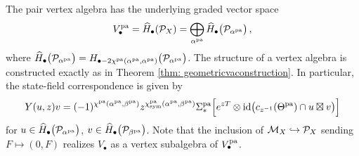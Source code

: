 \documentclass[a4paper, 12pt]{amsart}
\begin{document}
The pair vertex algebra has the underlying graded vector space 
$$
V^{\mathop{\rm pa}\nolimits}_\bullet =\widehat {H}_\bullet({\mathcal P}_{X})= \bigoplus_{\alpha^{\mathop{\rm pa}\nolimits}}\widehat{H}_{\bullet}\big({\mathcal P}_{\alpha^{\mathop{\rm pa}\nolimits}}\big)\,,
$$
where $\widehat{H}_\bullet\big({\mathcal P}_{\alpha^{\mathop{\rm pa}\nolimits}}\big) = H_{\bullet-2\chi^{\mathop{\rm pa}\nolimits}(\alpha^{\mathop{\rm pa}\nolimits}, \alpha^{\mathop{\rm pa}\nolimits})}\big({\mathcal P}_{\alpha^{\mathop{\rm pa}\nolimits}}\big)$. The structure of a vertex algebra is constructed exactly as in Theorem \ref{thm: geometricvaconstruction}. In particular, the state-field correspondence is given by
    \begin{equation}\label{eq: joycefieldspa}
    Y(u,z)v = (-1)^{\chi^{\mathop{\rm pa}\nolimits}(\alpha^{\mathop{\rm pa}\nolimits}, \beta^{\mathop{\rm pa}\nolimits})}z^{\chi_{\text{sym}}^{\mathop{\rm pa}\nolimits}(\alpha^{\mathop{\rm pa}\nolimits},\beta^{\mathop{\rm pa}\nolimits})}\Sigma^{\mathop{\rm pa}\nolimits}_\ast\Big[e^{zT}\otimes \text{id}\big(c_{z^{-1}}(\Theta^{\mathop{\rm pa}\nolimits})\cap u\boxtimes v\big)\Big]
    \end{equation}
for $u\in \widehat{H}_\bullet\big({\mathcal P}_{\alpha^{\mathop{\rm pa}\nolimits}}\big)$, $v\in \widehat{H}_\bullet\big({\mathcal P}_{\beta^{\mathop{\rm pa}\nolimits}}\big)$. 
Note that the inclusion of ${\mathcal M}_X\hookrightarrow {\mathcal P}_X$ sending $F\mapsto (0, F)$ realizes $V_\bullet$ as a vertex subalgebra of $V_\bullet^{\mathop{\rm pa}\nolimits}$.
\end{document}
